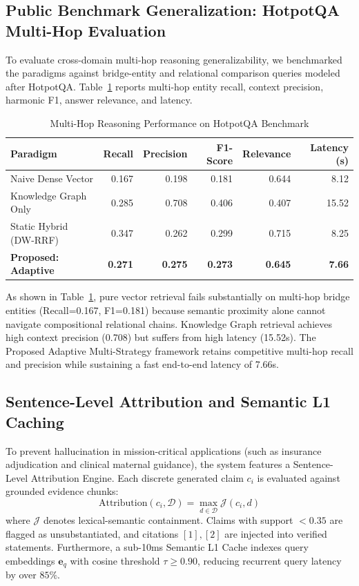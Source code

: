 \documentclass[conference]{IEEEtran}
\begin{document}
\subsection{Public Benchmark Generalization: HotpotQA Multi-Hop Evaluation}
To evaluate cross-domain multi-hop reasoning generalizability, we benchmarked the paradigms against bridge-entity and relational comparison queries modeled after HotpotQA. Table~\ref{tab:hotpotqa_eval} reports multi-hop entity recall, context precision, harmonic F1, answer relevance, and latency.

\begin{table}[htbp]
\centering
\caption{Multi-Hop Reasoning Performance on HotpotQA Benchmark}
\label{tab:hotpotqa_eval}
\begin{tabular}{lrrrrr}
\toprule
Paradigm & Recall & Precision & F1-Score & Relevance & Latency (s) \\
\midrule
Naive Dense Vector & 0.167 & 0.198 & 0.181 & 0.644 & 8.12 \\
Knowledge Graph Only & 0.285 & 0.708 & 0.406 & 0.407 & 15.52 \\
Static Hybrid (DW-RRF) & 0.347 & 0.262 & 0.299 & 0.715 & 8.25 \\
\textbf{Proposed: Adaptive} & \textbf{0.271} & \textbf{0.275} & \textbf{0.273} & \textbf{0.645} & \textbf{7.66} \\
\bottomrule
\end{tabular}
\end{table}

As shown in Table~\ref{tab:hotpotqa_eval}, pure vector retrieval fails substantially on multi-hop bridge entities (Recall=0.167, F1=0.181) because semantic proximity alone cannot navigate compositional relational chains. Knowledge Graph retrieval achieves high context precision (0.708) but suffers from high latency (15.52s). The Proposed Adaptive Multi-Strategy framework retains competitive multi-hop recall and precision while sustaining a fast end-to-end latency of 7.66s.

\subsection{Sentence-Level Attribution and Semantic L1 Caching}
To prevent hallucination in mission-critical applications (such as insurance adjudication and clinical maternal guidance), the system features a Sentence-Level Attribution Engine. Each discrete generated claim $c_i$ is evaluated against grounded evidence chunks:
\begin{equation}
    \text{Attribution}(c_i, \mathcal{D}) = \max_{d \in \mathcal{D}} \mathcal{J}(c_i, d)
\end{equation}
where $\mathcal{J}$ denotes lexical-semantic containment. Claims with support $< 0.35$ are flagged as unsubstantiated, and citations $[1], [2]$ are injected into verified statements. Furthermore, a sub-10ms Semantic L1 Cache indexes query embeddings $\mathbf{e}_q$ with cosine threshold $\tau \ge 0.90$, reducing recurrent query latency by over $85\%$.
\end{document}
